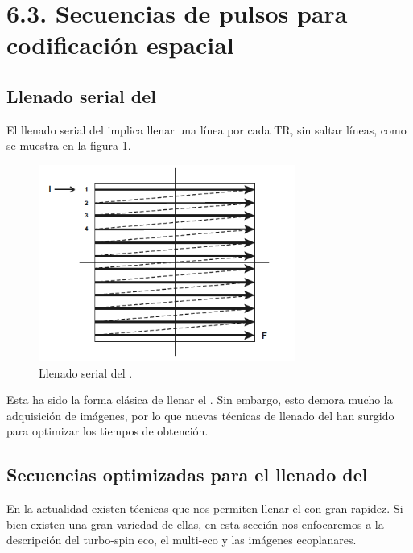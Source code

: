 \section{6.3. Secuencias de pulsos para codificación espacial}

\subsection{Llenado serial del \espaciok}
El llenado serial del \espaciok implica llenar una línea por cada TR, sin saltar líneas, como se muestra en la  figura \ref{fig:seq_kspacelinear}.



\begin{figure}[htb]
\begin{figg}
   \includegraphics[width=0.75\textwidth]{vite_14}
   \caption{Llenado serial del \espaciok.}
 \label{fig:seq_kspacelinear}
 \end{figg}
\end{figure}


Esta ha sido la forma clásica de llenar el \espaciok. Sin embargo, esto demora mucho la adquisición de imágenes, por lo que nuevas técnicas de llenado del \espaciok han surgido para optimizar los tiempos de obtención. 

\subsection{Secuencias optimizadas para el llenado del \espaciok}
En la actualidad existen técnicas que nos permiten llenar el \espaciok con gran rapidez. Si bien existen una gran variedad de ellas, en esta sección nos enfocaremos a la descripción del turbo-spin eco, el multi-eco y las imágenes ecoplanares. 

